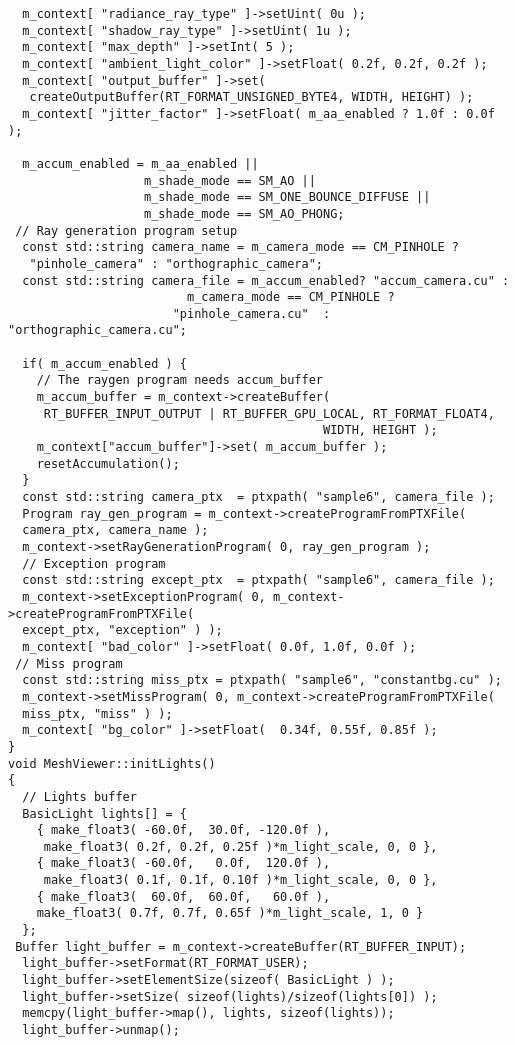 \begin{verbatim}
  m_context[ "radiance_ray_type" ]->setUint( 0u );
  m_context[ "shadow_ray_type" ]->setUint( 1u );
  m_context[ "max_depth" ]->setInt( 5 );
  m_context[ "ambient_light_color" ]->setFloat( 0.2f, 0.2f, 0.2f );
  m_context[ "output_buffer" ]->set(
   createOutputBuffer(RT_FORMAT_UNSIGNED_BYTE4, WIDTH, HEIGHT) );
  m_context[ "jitter_factor" ]->setFloat( m_aa_enabled ? 1.0f : 0.0f );
  
  m_accum_enabled = m_aa_enabled ||
                   m_shade_mode == SM_AO ||
                   m_shade_mode == SM_ONE_BOUNCE_DIFFUSE ||
                   m_shade_mode == SM_AO_PHONG;
 // Ray generation program setup
  const std::string camera_name = m_camera_mode == CM_PINHOLE ?
   "pinhole_camera" : "orthographic_camera"; 
  const std::string camera_file = m_accum_enabled? "accum_camera.cu" :
                         m_camera_mode == CM_PINHOLE ?
                       "pinhole_camera.cu"  : "orthographic_camera.cu";

  if( m_accum_enabled ) {
    // The raygen program needs accum_buffer
    m_accum_buffer = m_context->createBuffer(
     RT_BUFFER_INPUT_OUTPUT | RT_BUFFER_GPU_LOCAL, RT_FORMAT_FLOAT4,
                                            WIDTH, HEIGHT );
    m_context["accum_buffer"]->set( m_accum_buffer );
    resetAccumulation();
  }
  const std::string camera_ptx  = ptxpath( "sample6", camera_file );
  Program ray_gen_program = m_context->createProgramFromPTXFile( 
  camera_ptx, camera_name );
  m_context->setRayGenerationProgram( 0, ray_gen_program );
  // Exception program
  const std::string except_ptx  = ptxpath( "sample6", camera_file );
  m_context->setExceptionProgram( 0, m_context->createProgramFromPTXFile( 
  except_ptx, "exception" ) );
  m_context[ "bad_color" ]->setFloat( 0.0f, 1.0f, 0.0f );
 // Miss program 
  const std::string miss_ptx = ptxpath( "sample6", "constantbg.cu" );
  m_context->setMissProgram( 0, m_context->createProgramFromPTXFile( 
  miss_ptx, "miss" ) );
  m_context[ "bg_color" ]->setFloat(  0.34f, 0.55f, 0.85f );
}
void MeshViewer::initLights()
{
  // Lights buffer
  BasicLight lights[] = {
    { make_float3( -60.0f,  30.0f, -120.0f ),
     make_float3( 0.2f, 0.2f, 0.25f )*m_light_scale, 0, 0 },
    { make_float3( -60.0f,   0.0f,  120.0f ),
     make_float3( 0.1f, 0.1f, 0.10f )*m_light_scale, 0, 0 },
    { make_float3(  60.0f,  60.0f,   60.0f ), 
    make_float3( 0.7f, 0.7f, 0.65f )*m_light_scale, 1, 0 }
  };
 Buffer light_buffer = m_context->createBuffer(RT_BUFFER_INPUT);
  light_buffer->setFormat(RT_FORMAT_USER);
  light_buffer->setElementSize(sizeof( BasicLight ) );
  light_buffer->setSize( sizeof(lights)/sizeof(lights[0]) );
  memcpy(light_buffer->map(), lights, sizeof(lights));
  light_buffer->unmap();


\end{verbatim}
